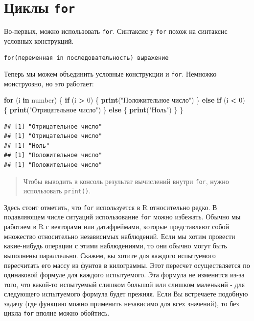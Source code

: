 \documentclass[
]{book}
\newenvironment{Shaded}{\begin{snugshade}}{\end{snugshade}}
\newcommand{\ControlFlowTok}[1]{\textcolor[rgb]{0.13,0.29,0.53}{\textbf{#1}}}
\newcommand{\DecValTok}[1]{\textcolor[rgb]{0.00,0.00,0.81}{#1}}
\newcommand{\KeywordTok}[1]{\textcolor[rgb]{0.13,0.29,0.53}{\textbf{#1}}}
\newcommand{\NormalTok}[1]{#1}
\newcommand{\OperatorTok}[1]{\textcolor[rgb]{0.81,0.36,0.00}{\textbf{#1}}}
\newcommand{\StringTok}[1]{\textcolor[rgb]{0.31,0.60,0.02}{#1}}
\begin{document}
\hypertarget{for}{%
\section{\texorpdfstring{Циклы \texttt{for}}{Циклы for}}\label{for}}

Во-первых, можно использовать \texttt{for}. Синтаксис у \texttt{for} похож на синтаксис условных конструкций.

\begin{verbatim}
for(переменная in последовательность) выражение
\end{verbatim}

Теперь мы можем объединить условные конструкции и \texttt{for}. Немножко монструозно, но это работает:

\begin{Shaded}
\begin{Highlighting}[]
\ControlFlowTok{for}\NormalTok{ (i }\ControlFlowTok{in}\NormalTok{ number) \{}
  \ControlFlowTok{if}\NormalTok{ (i }\OperatorTok{>}\StringTok{ }\DecValTok{0}\NormalTok{) \{}
    \KeywordTok{print}\NormalTok{(}\StringTok{"Положительное число"}\NormalTok{)}
\NormalTok{  \} }\ControlFlowTok{else} \ControlFlowTok{if}\NormalTok{ (i }\OperatorTok{<}\StringTok{ }\DecValTok{0}\NormalTok{) \{}
    \KeywordTok{print}\NormalTok{(}\StringTok{"Отрицательное число"}\NormalTok{)}
\NormalTok{  \} }\ControlFlowTok{else}\NormalTok{ \{}
    \KeywordTok{print}\NormalTok{(}\StringTok{"Ноль"}\NormalTok{)}
\NormalTok{  \}}
\NormalTok{\}}
\end{Highlighting}
\end{Shaded}

\begin{verbatim}
## [1] "Отрицательное число"
## [1] "Отрицательное число"
## [1] "Ноль"
## [1] "Положительное число"
## [1] "Положительное число"
\end{verbatim}

\begin{quote}
Чтобы выводить в консоль результат вычислений внутри \texttt{for}, нужно использовать \texttt{print()}.
\end{quote}

Здесь стоит отметить, что \texttt{for} используется в R относительно редко. В подавляющем числе ситуаций использование \texttt{for} можно избежать. Обычно мы работаем в R с векторами или датафреймами, которые представляют собой множество относительно независимых наблюдений. Если мы хотим провести какие-нибудь операции с этими наблюдениями, то они обычно могут быть выполнены параллельно. Скажем, вы хотите для каждого испытуемого пересчитать его массу из фунтов в килограммы. Этот пересчет осуществляется по одинаковой формуле для каждого испытуемого. Эта формула не изменится из-за того, что какой-то испытуемый слишком большой или слишком маленький - для следующего испытуемого формула будет прежняя. Если Вы встречаете подобную задачу (где функцию можно применить независимо для всех значений), то без цикла \texttt{for} вполне можно обойтись.
\end{document}
